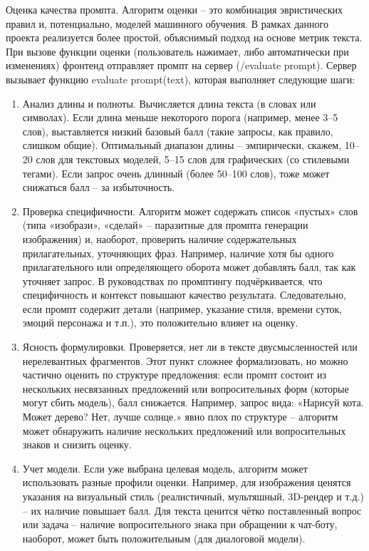 Оценка качества промпта. Алгоритм оценки – это комбинация эвристических правил и, потенциально, моделей машинного обучения. В рамках данного проекта реализуется более простой, объяснимый подход на основе метрик текста. При вызове функции оценки (пользователь нажимает, либо автоматически при изменениях) фронтенд отправляет промпт на сервер (/evaluate prompt). Сервер вызывает функцию evaluate prompt(text), которая выполняет следующие шаги:
\begin{enumerate}[label=\arabic*.]
    \item Анализ длины и полноты. Вычисляется длина текста (в словах или символах). Если длина меньше некоторого порога (например, менее 3–5 слов), выставляется низкий базовый балл (такие запросы, как правило, слишком общие). Оптимальный диапазон длины – эмпирически, скажем, 10–20 слов для текстовых моделей, 5–15 слов для графических (со стилевыми тегами). Если запрос очень длинный (более 50–100 слов), тоже может снижаться балл – за избыточность.
    \item Проверка специфичности. Алгоритм может содержать список «пустых» слов (типа «изобрази», «сделай» – паразитные для промпта генерации изображения) и, наоборот, проверить наличие содержательных прилагательных, уточняющих фраз. Например, наличие хотя бы одного прилагательного или определяющего оборота может добавлять балл, так как уточняет запрос. В руководствах по промптингу подчёркивается, что специфичность и контекст повышают качество результата\cite{promptingguide:basics}. Следовательно, если промпт содержит детали (например, указание стиля, времени суток, эмоций персонажа и т.п.), это положительно влияет на оценку.
    \item Ясность формулировки. Проверяется, нет ли в тексте двусмысленностей или нерелевантных фрагментов. Этот пункт сложнее формализовать, но можно частично оценить по структуре предложения: если промпт состоит из нескольких несвязанных предложений или вопросительных форм (которые могут сбить модель), балл снижается. Например, запрос вида: «Нарисуй кота. Может дерево? Нет, лучше солнце.» явно плох по структуре – алгоритм может обнаружить наличие нескольких предложений или вопросительных знаков и снизить оценку.
    \item Учет модели. Если уже выбрана целевая модель, алгоритм может использовать разные профили оценки. Например, для изображения ценятся указания на визуальный стиль (реалистичный, мультяшный, 3D-рендер и т.д.) – их наличие повышает балл. Для текста ценится чётко поставленный вопрос или задача – наличие вопросительного знака при обращении к чат-боту, наоборот, может быть положительным (для диалоговой модели).

\end{enumerate}
